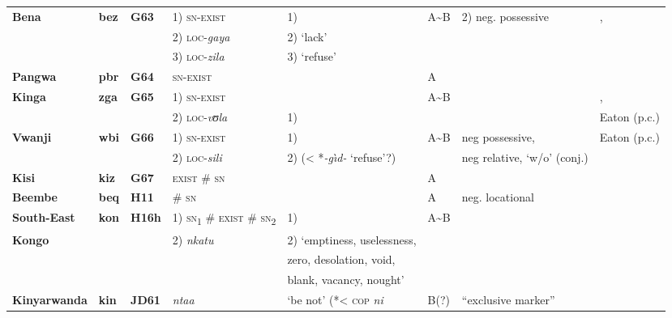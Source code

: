 \documentclass[output=paper]{langscibook}
\begin{document}
\begin{sidewaystable}[p]%
\begin{scriptsize}
\begin{tabularx}{\textwidth}{llllllll}
\lsptoprule
\textbf{Bena}	&\textbf{bez}	&\textbf{G63}	&1) \textsc{sn-exist}&1) \textendash						&A{\textasciitilde}B&2) neg. possessive						&\citet{Morrison2011},\\
				&				&				&2) \textsc{loc}-\textit{gaya}&2) `lack'						&		&												&\citet{Eaton2015a}\\
				&				&				&3) \textsc{loc}-\textit{zila}&3) `refuse'\\\midrule
\textbf{Pangwa}	&\textbf{pbr}	&\textbf{G64}	&\textsc{sn-exist}&\textendash								&A{}	&												&\citet{Stirnimann1983}\\\midrule
\textbf{Kinga} 	&\textbf{zga}	&\textbf{G65} 	&1) \textsc{sn-exist}&\textendash							&A{\textasciitilde}B&										&\citet{Wolff1905},\\
				&				&				&2) \textsc{loc}-\textit{vʊla}&1) \textendash					&		&												&Eaton (p.c.)\\\midrule
\textbf{Vwanji} 	&\textbf{wbi}	&\textbf{G66} 	&1) \textsc{sn-exist}&1) \textendash						&A{\textasciitilde}B&neg possessive,						&Eaton (p.c.)\\
				&				&				&2) \textsc{loc}-\textit{sili}&2) (< *\textit{-g{\`\i}d-} `refuse'?)&		&neg relative, `w/o' (conj.)\\\midrule
\textbf{Kisi}		&\textbf{kiz}		&\textbf{G67}	&\textsc{exist \# sn}&\textendash							&A{}	&												&\citet{Ngonyani2011}\\\midrule
\textbf{Beembe} 	&\textbf{beq}	&\textbf{H11}	&\# \textsc{sn}	&\textendash								&A{}	&neg. locational 									&\citet{Nsayi1984}\\\midrule
\textbf{South-East}&\textbf{kon}	&\textbf{H16h}	&1) \textsc{sn}\textsubscript{1} \# \textsc{exist} \# \textsc{sn}\textsubscript{2}&1) \textendash	&A{\textasciitilde}B&		&\citet{Bentley1887}\\
\textbf{Kongo}	&				&				&2) \textit{nkatu}									&2) `emptiness, uselessness,\\
				&				&				&												&zero, desolation, void,\\
				&				&				&												&blank, vacancy, nought'\\\midrule
\textbf{Kinyarwanda}&\textbf{kin}	&\textbf{JD61}	&\textit{ntaa} 	&`be not' (*< \textsc{cop} \textit{ni}		&B(?) 	&``exclusive marker''								&\citet{Kimenyi1980}\\

\end{tabularx}
\end{scriptsize}
\end{sidewaystable}
\end{document}
